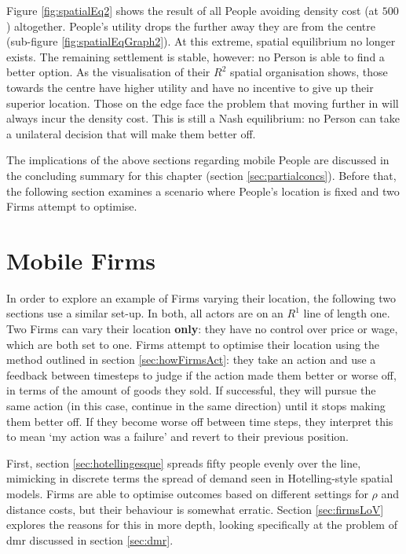 Figure \ref{fig:spatialEq2} shows the result of all People avoiding density cost (at $500$) altogether. People's utility drops the further away they are from the centre (sub-figure \ref{fig:spatialEqGraph2}). At this extreme, spatial  equilibrium no longer exists. The remaining settlement is stable, however: no Person is able to find a better option. As the visualisation of their $R^2$ spatial organisation shows, those towards the centre have higher utility and have no incentive to give up their superior location. Those on the edge face the problem that moving further in will always incur the density cost. This is still a Nash equilibrium: no Person can take a unilateral decision that will make them better off. 

The implications of the above sections regarding mobile People are discussed in the concluding summary for this chapter (section \ref{sec:partialconcs}). Before that, the following section examines a scenario where People's location is fixed and two Firms attempt to optimise. 

\section{Mobile Firms \label{sec:mobFirms}}

In order to explore an example of Firms varying their location, the following two sections use a similar set-up. In both, all actors are on an $R^1$ line of length one. Two Firms can vary their location \textbf{only}: they have no control over price or wage, which are both set to one. Firms attempt to optimise their location using the method outlined in section \ref{sec:howFirmsAct}: they take an action and use a feedback between timesteps to judge if the action made them better or worse off, in terms of the amount of goods they sold. If successful, they will pursue the same action (in this case, continue in the same direction) until it stops making them better off. If they become worse off between time steps, they interpret this to mean `my action was a failure' and revert to their previous position.

First, section \ref{sec:hotellingesque} spreads fifty people evenly over the line, mimicking in discrete terms the spread of demand seen in Hotelling-style spatial models. Firms are able to optimise outcomes based on different settings for $\rho$ and distance costs, but their behaviour is somewhat erratic. Section \ref{sec:firmsLoV} explores the reasons for this in more depth, looking specifically at the problem of \gls{dmr} discussed in section \ref{sec:dmr}. 

